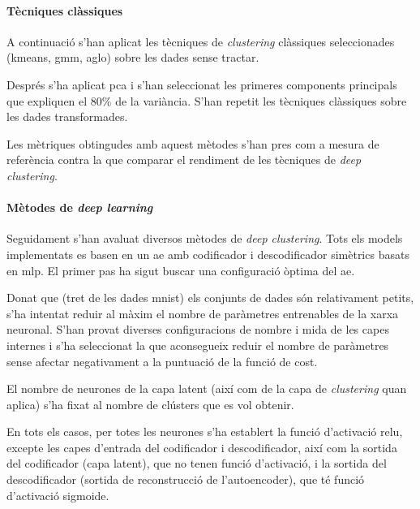 \documentclass[CAT,BIB]{TFUOC}%
\begin{document}
    \paragraph{Tècniques clàssiques}
        A continuació
        s'han aplicat les tècniques de \textit{clustering} clàssiques seleccionades
        (\gls{kmeans}, \gls{gmm}, \gls{aglo})
        sobre les dades sense tractar.

        Després s'ha aplicat \gls{pca}
        i s'han seleccionat les primeres components principals
        que expliquen el 80\% de la variància.
        S'han repetit les tècniques clàssiques
        sobre les dades transformades.

        Les mètriques obtingudes amb aquest mètodes
        s'han pres com a mesura de referència
        contra la que comparar el rendiment de les tècniques de \textit{deep clustering}.

    \paragraph{Mètodes de \textit{deep learning}}
        Seguidament
        s'han avaluat diversos mètodes de \textit{deep clustering}.
        Tots els models implementats es basen en un \gls{ae}
        amb codificador i descodificador simètrics
        basats en \gls{mlp}.
        El primer pas ha sigut buscar una configuració òptima del \gls{ae}.

        Donat que (tret de les dades \gls{mnist}) els conjunts de dades són relativament petits,
        s'ha intentat reduir al màxim el nombre de paràmetres entrenables de la xarxa neuronal.
        S'han provat diverses configuracions de nombre i mida de les capes internes
        i s'ha seleccionat la que aconsegueix reduir el nombre de paràmetres
        sense afectar negativament a la puntuació de la funció de cost.

        El nombre de neurones de la capa latent
        (així com de la capa de \textit{clustering} quan aplica)
        s'ha fixat al nombre de clústers que es vol obtenir.

        En tots els casos,
        per totes les neurones s'ha establert la funció d'activació \gls{relu},
        excepte les capes d'entrada del codificador i descodificador,
        així com la sortida del codificador (capa latent),
        que no tenen funció d'activació,
        i la sortida del descodificador (sortida de reconstrucció de l'autoencoder),
        que té funció d'activació sigmoide.
\end{document}
